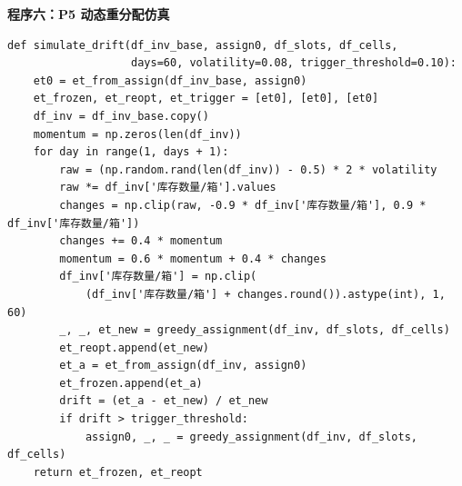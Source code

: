 \documentclass[a4paper]{cumcmthesis}
\begin{document}
\begin{appendices}
\textbf{程序六：P5 动态重分配仿真}
\begin{lstlisting}[style=pythonstyle, caption={带趋势项的库存波动与重分配触发}]
def simulate_drift(df_inv_base, assign0, df_slots, df_cells,
                   days=60, volatility=0.08, trigger_threshold=0.10):
    et0 = et_from_assign(df_inv_base, assign0)
    et_frozen, et_reopt, et_trigger = [et0], [et0], [et0]
    df_inv = df_inv_base.copy()
    momentum = np.zeros(len(df_inv))
    for day in range(1, days + 1):
        raw = (np.random.rand(len(df_inv)) - 0.5) * 2 * volatility
        raw *= df_inv['库存数量/箱'].values
        changes = np.clip(raw, -0.9 * df_inv['库存数量/箱'], 0.9 * df_inv['库存数量/箱'])
        changes += 0.4 * momentum
        momentum = 0.6 * momentum + 0.4 * changes
        df_inv['库存数量/箱'] = np.clip(
            (df_inv['库存数量/箱'] + changes.round()).astype(int), 1, 60)
        _, _, et_new = greedy_assignment(df_inv, df_slots, df_cells)
        et_reopt.append(et_new)
        et_a = et_from_assign(df_inv, assign0)
        et_frozen.append(et_a)
        drift = (et_a - et_new) / et_new
        if drift > trigger_threshold:
            assign0, _, _ = greedy_assignment(df_inv, df_slots, df_cells)
    return et_frozen, et_reopt
\end{lstlisting}
\end{appendices}
\end{document}
